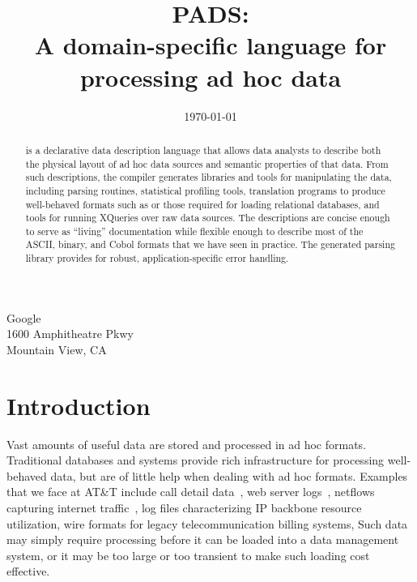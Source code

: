 \documentclass[times]{acm-sigplan}
\begin{document}
\title{PADS:\\ A domain-specific language for processing ad hoc data}

       {}

       {Google\\
       1600 Amphitheatre Pkwy\\
        Mountain View, CA}
       {}

\date{\today}


\maketitle
\begin{abstract}
\pads{} is a declarative data description language that allows data
analysts to describe both the physical layout of ad hoc data sources
and semantic properties of that data.  From such descriptions, the
\pads{} compiler generates libraries and tools for manipulating the
data, including parsing routines, statistical profiling tools,
translation programs to produce well-behaved
formats such as \xml{} or those required for loading relational
databases, and tools for running XQueries over raw \pads{} data sources.
The descriptions are concise enough to serve as ``living'' documentation
while flexible enough to describe most of the ASCII, binary, and
Cobol formats that we have seen in practice.  The generated parsing
library provides for robust, application-specific error handling.
\end{abstract}

\section{Introduction}
Vast amounts of useful data are stored and processed in ad hoc formats.
Traditional databases and \xml{} systems provide rich infrastructure
for processing well-behaved data, but are of little help when dealing with ad hoc formats.
Examples that we face at AT\&T include call detail data~\cite{hancock-toplas}, 
web server logs~\cite{wpp}, 
netflows capturing internet traffic~\cite{netflow}, 
log files characterizing IP backbone resource utilization,
wire formats for legacy telecommunication billing systems, 
\etc{}
Such data may simply require processing before it can be loaded into a
data management system, or it may be too large or too transient to
make such loading cost effective.
\end{document}
